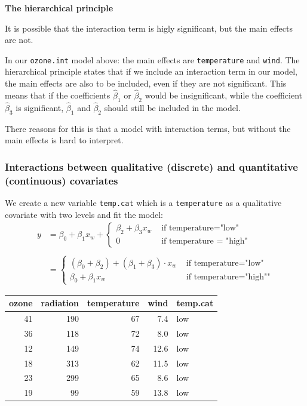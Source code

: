 \documentclass[
]{article}
\begin{document}
\textbf{The hierarchical principle}

It is possible that the interaction term is higly significant, but the
main effects are not.

In our \texttt{ozone.int} model above: the main effects are
\texttt{temperature} and \texttt{wind}. The hierarchical principle
states that if we include an interaction term in our model, the main
effects are also to be included, even if they are not significant. This
means that if the coefficients \(\hat \beta_1\) or \(\hat \beta_2\)
would be insignificant, while the coefficient \(\hat \beta_3\) is
significant, \(\hat \beta_1\) and \(\hat \beta_2\) should still be
included in the model.

There reasons for this is that a model with interaction terms, but
without the main effects is hard to interpret.

\hypertarget{interactions-between-qualitative-discrete-and-quantitative-continuous-covariates}{%
\subsubsection{Interactions between qualitative (discrete) and
quantitative (continuous)
covariates}\label{interactions-between-qualitative-discrete-and-quantitative-continuous-covariates}}

We create a new variable \texttt{temp.cat} which is a
\texttt{temperature} as a qualitative covariate with two levels and fit
the model:
\[\begin{aligned}y&=\beta_0 + \beta_1 x_w + \begin{cases} \beta_2 + \beta_3  x_w  &\text{ if temperature="low"}\\ 0 &\text{ if temperature = "high"}\end{cases} \\\\ &= \begin{cases} (\beta_0 + \beta_2) + (\beta_1 + \beta_3) \cdot x_w &\text{ if temperature="low"}\\ \beta_0 + \beta_1 x_w &\text{ if temperature="high""} \end{cases} \end{aligned}\]

\begin{tabular}{r|r|r|r|l}
\hline
ozone & radiation & temperature & wind & temp.cat\\
\hline
41 & 190 & 67 & 7.4 & low\\
\hline
36 & 118 & 72 & 8.0 & low\\
\hline
12 & 149 & 74 & 12.6 & low\\
\hline
18 & 313 & 62 & 11.5 & low\\
\hline
23 & 299 & 65 & 8.6 & low\\
\hline
19 & 99 & 59 & 13.8 & low\\
\hline
\end{tabular}
\end{document}
